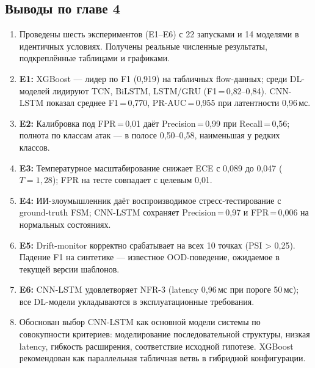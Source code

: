 \subsection*{Выводы по главе 4}

\begin{enumerate}
    \item Проведены шесть экспериментов (E1--E6) с 22 запусками и
    14 моделями в идентичных условиях. Получены реальные
    численные результаты, подкреплённые таблицами и графиками.
    \item \textbf{E1:} XGBoost --- лидер по F1 (0{,}919) на табличных
    flow-данных; среди DL-моделей лидируют TCN, BiLSTM, LSTM/GRU
    (F1\,=\,0{,}82--0{,}84). CNN-LSTM показал среднее F1\,=\,0{,}770,
    PR-AUC\,=\,0{,}955 при латентности 0{,}96\,мс.
    \item \textbf{E2:} Калибровка под FPR\,=\,0{,}01 даёт
    Precision\,=\,0{,}99 при Recall\,=\,0{,}56; полнота по классам
    атак --- в полосе 0{,}50--0{,}58, наименьшая у редких классов.
    \item \textbf{E3:} Температурное масштабирование снижает ECE с
    0{,}089 до 0{,}047 ($T = 1{,}28$); FPR на тесте совпадает с
    целевым 0{,}01.
    \item \textbf{E4:} ИИ-злоумышленник даёт воспроизводимое
    стресс-тестирование с ground-truth FSM; CNN-LSTM сохраняет
    Precision\,=\,0{,}97 и FPR\,=\,0{,}006 на нормальных
    состояниях.
    \item \textbf{E5:} Drift-monitor корректно срабатывает на всех
    10 точках (PSI > 0{,}25). Падение F1 на синтетике --- известное
    OOD-поведение, ожидаемое в текущей версии шаблонов.
    \item \textbf{E6:} CNN-LSTM удовлетворяет NFR-3 (latency
    0{,}96\,мс при пороге 50\,мс); все DL-модели укладываются в
    эксплуатационные требования.
    \item Обоснован выбор CNN-LSTM как основной модели системы по
    совокупности критериев: моделирование последовательной структуры,
    низкая latency, гибкость расширения, соответствие исходной
    гипотезе. XGBoost рекомендован как параллельная табличная ветвь
    в гибридной конфигурации.
\end{enumerate}
